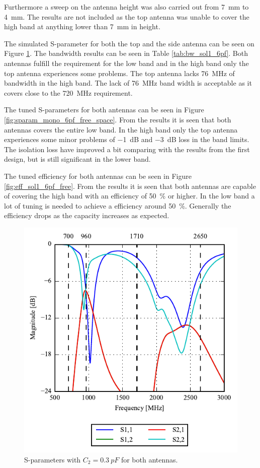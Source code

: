 Furthermore a sweep on the antenna height was also carried out from \SI{7}{mm} to \SI{4}{mm}. The results are not included as the top antenna was unable to cover the high band at anything lower than \SI{7}{mm} in height.


The simulated S-parameter for both the top and the side antenna can be seen on Figure \ref{fig:ant1_6pf_sparam}. The bandwidth results can be seen in Table \ref{tab:bw_sol1_6pf}. Both antennas fulfill the requirement for the low band and in the high band only the top antenna experiences some problems. The top antenna lacks \SI{76}{MHz} of bandwidth in the high band. The lack of \SI{76}{MHz} band width is acceptable as it covers close to the \SI{720}{MHz} requirement.

The tuned S-parameters for both antennas can be seen in Figure \ref{fig:sparam_mono_6pf_free_space}. From the results it is seen that both antennas covers the entire low band. In the high band only the top antenna experiences some minor problems of \SI{-1}{dB} and \SI{-3}{dB} loss in the band limits. The isolation loss have improved a bit comparing with the results from the first design, but is still significant in the lower band.     

The tuned efficiency for both antennas can be seen in Figure \ref{fig:eff_sol1_6pf_free}. From the results it is seen that both antennas are capable of covering the high band with an efficiency of \SI{50}{\percent} or higher. In the low band a lot of tuning is needed to achieve a efficiency around \SI{50}{\percent}. Generally the efficiency drops as the capacity increases as expected.  

\begin{figure}[htbp]
    \centering
    \includegraphics{img/tech_sol/monopole/5mm/6pf_sparams}
    \caption{S-parameters with $C_2=\SI{0.3}{pF}$ for both antennas.}
    \label{fig:ant1_6pf_sparam}
\end{figure}

